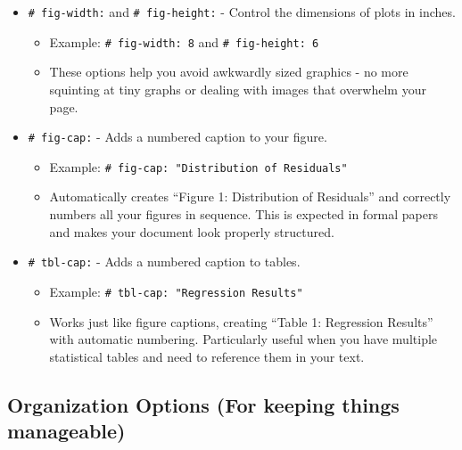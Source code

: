 \documentclass[
  letterpaper,
]{book}
\providecommand{\tightlist}{%
  \setlength{\itemsep}{0pt}\setlength{\parskip}{0pt}}\usepackage{longtable,booktabs,array}
\begin{document}
\begin{itemize}
\item
  \texttt{\#\textbar{}\ fig-width:} and
  \texttt{\#\textbar{}\ fig-height:} - Control the dimensions of plots
  in inches.

  \begin{itemize}
  \tightlist
  \item
    Example: \texttt{\#\textbar{}\ fig-width:\ 8} and
    \texttt{\#\textbar{}\ fig-height:\ 6}
  \item
    These options help you avoid awkwardly sized graphics - no more
    squinting at tiny graphs or dealing with images that overwhelm your
    page.
  \end{itemize}
\item
  \texttt{\#\textbar{}\ fig-cap:} - Adds a numbered caption to your
  figure.

  \begin{itemize}
  \tightlist
  \item
    Example:
    \texttt{\#\textbar{}\ fig-cap:\ "Distribution\ of\ Residuals"}
  \item
    Automatically creates ``Figure 1: Distribution of Residuals'' and
    correctly numbers all your figures in sequence. This is expected in
    formal papers and makes your document look properly structured.
  \end{itemize}
\item
  \texttt{\#\textbar{}\ tbl-cap:} - Adds a numbered caption to tables.

  \begin{itemize}
  \tightlist
  \item
    Example: \texttt{\#\textbar{}\ tbl-cap:\ "Regression\ Results"}
  \item
    Works just like figure captions, creating ``Table 1: Regression
    Results'' with automatic numbering. Particularly useful when you
    have multiple statistical tables and need to reference them in your
    text.
  \end{itemize}
\end{itemize}

\subsection{Organization Options (For keeping things
manageable)}\label{organization-options-for-keeping-things-manageable}
\end{document}
